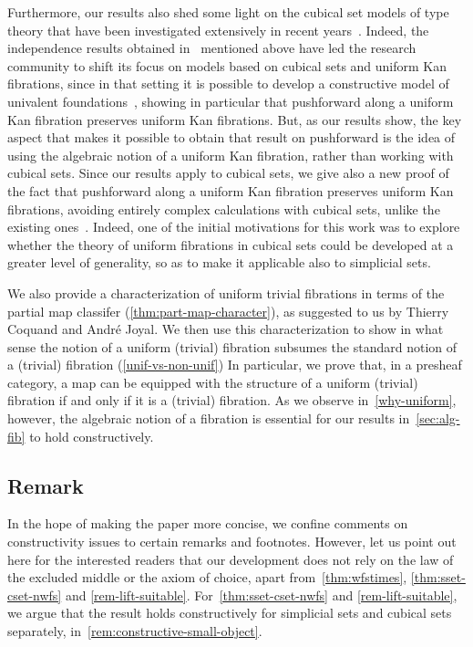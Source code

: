 \documentclass[reqno,10pt,a4paper,oneside,draft]{amsart}
\begin{document}
Furthermore, our results also shed some light on the cubical set models of type theory that have been 
investigated extensively in recent years~\cite{awodey-cubical,coquand-cubical-sets,cohen-et-al:cubicaltt,pitts-cubical-nominal,swan-awfs}. Indeed, the independence results obtained in~\cite{coquand-non-constructivity-kan} mentioned above have led the research community to shift its focus on models based on cubical sets and uniform Kan fibrations, since in that setting it is possible to develop a constructive model of univalent foundations~\cite{cohen-et-al:cubicaltt}, showing in particular that pushforward along a uniform Kan fibration preserves uniform Kan fibrations. But, as our results show, the key aspect that makes it possible to obtain that result on pushforward is the idea of using the algebraic notion of a uniform Kan fibration, rather than working with cubical sets. Since our results apply to cubical sets, we give also a new proof of the fact that pushforward along a uniform Kan fibration preserves uniform Kan fibrations, avoiding entirely complex calculations with cubical sets, unlike the existing ones~\cite{cohen-et-al:cubicaltt,huber-thesis}.
Indeed, one of the initial motivations for this work was to explore whether the theory of uniform fibrations in cubical sets could be developed at a greater level of generality, so as to make it applicable also to simplicial sets.

We also provide a characterization of uniform trivial fibrations in terms of the partial map classifer (\cref{thm:part-map-character}), as suggested to us by Thierry Coquand and Andr\'e Joyal.
We then use this characterization to show in what sense the notion of a uniform (trivial) fibration subsumes the standard notion of a (trivial) fibration (\cref{unif-vs-non-unif}) In particular, we prove that, in a presheaf category, a map can be equipped with the structure of a uniform (trivial) fibration if and only if it is a (trivial) fibration.
As we observe in~\cref{why-uniform}, however, the algebraic notion of a fibration is essential for our results in~\cref{sec:alg-fib} to hold constructively.

\subsection*{Remark}
In the hope of making the paper more concise, we confine comments on constructivity issues to certain remarks and footnotes.
However, let us point out here for the interested readers that our development does not rely on the law of the excluded middle or the axiom of choice, apart from~\cref{thm:wfstimes}, \cref{thm:sset-cset-nwfs} and \cref{rem-lift-suitable}.
For~\cref{thm:sset-cset-nwfs} and \cref{rem-lift-suitable}, we argue that the result holds constructively for simplicial sets and cubical sets separately, in~\cref{rem:constructive-small-object}.%
\end{document}
